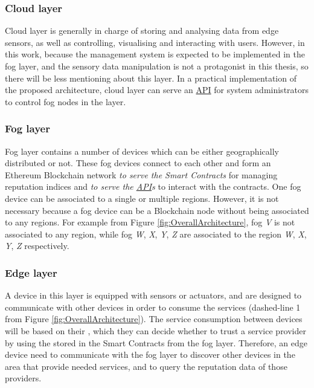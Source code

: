 \subsubsection*{Cloud layer}
\npara Cloud layer is generally in charge of storing and analysing data from edge sensors, as well as controlling, visualising and interacting with users.
However, in this work, because the management system is expected to be implemented in the fog layer, and the sensory data manipulation is not a protagonist in this thesis, so there will be less mentioning about this layer.
In a practical implementation of the proposed architecture, cloud layer can serve an \hyperref[Acronym-API]{API} for system administrators to control fog nodes in the layer.

\subsubsection*{Fog layer}
\npara Fog layer contains a number of devices which can be either geographically distributed or not.
These fog devices connect to each other and form an Ethereum Blockchain network \textit{to serve the Smart Contracts} for managing reputation indices and \textit{to serve the \hyperref[Acronym-API]{API}s} to interact with the contracts.
One fog device can be associated to a single or multiple regions.
However, it is not necessary because a fog device can be a Blockchain node without being associated to any regions.
For example from Figure \ref{fig:OverallArchitecture}, fog \textit{V} is not associated to any region, while fog \textit{W}, \textit{X}, \textit{Y}, \textit{Z} are associated to the region \textit{W}, \textit{X}, \textit{Y}, \textit{Z} respectively.

\subsubsection*{Edge layer}
\npara A device in this layer is equipped with sensors or actuators, and are designed to communicate with other devices in order to consume the services (dashed-line 1 from Figure \ref{fig:OverallArchitecture}).
The service consumption between devices will be based on their , which they can decide whether to trust a service provider by using the  stored in the Smart Contracts from the fog layer.
Therefore, an edge device need to communicate with the fog layer to discover other devices in the area that provide needed services, and to query the reputation data of those providers.

